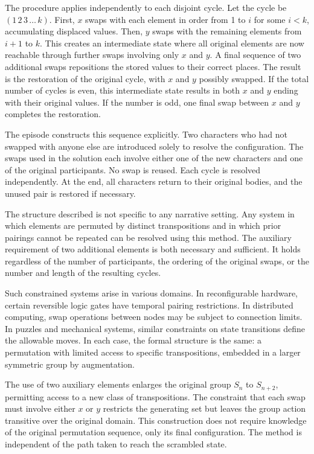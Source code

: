 The procedure applies independently to each disjoint cycle. Let the cycle be \( (1\,2\,3\,\dots\,k) \). First, \( x \) swaps with each element in order from 1 to \( i \) for some \( i < k \), accumulating displaced values. Then, \( y \) swaps with the remaining elements from \( i+1 \) to \( k \). This creates an intermediate state where all original elements are now reachable through further swaps involving only \( x \) and \( y \). A final sequence of two additional swaps repositions the stored values to their correct places. The result is the restoration of the original cycle, with \( x \) and \( y \) possibly swapped. If the total number of cycles is even, this intermediate state results in both \( x \) and \( y \) ending with their original values. If the number is odd, one final swap between \( x \) and \( y \) completes the restoration.

The episode constructs this sequence explicitly. Two characters who had not swapped with anyone else are introduced solely to resolve the configuration. The swaps used in the solution each involve either one of the new characters and one of the original participants. No swap is reused. Each cycle is resolved independently. At the end, all characters return to their original bodies, and the unused pair is restored if necessary.

The structure described is not specific to any narrative setting. Any system in which elements are permuted by distinct transpositions and in which prior pairings cannot be repeated can be resolved using this method. The auxiliary requirement of two additional elements is both necessary and sufficient. It holds regardless of the number of participants, the ordering of the original swaps, or the number and length of the resulting cycles.

Such constrained systems arise in various domains. In reconfigurable hardware, certain reversible logic gates have temporal pairing restrictions. In distributed computing, swap operations between nodes may be subject to connection limits. In puzzles and mechanical systems, similar constraints on state transitions define the allowable moves. In each case, the formal structure is the same: a permutation with limited access to specific transpositions, embedded in a larger symmetric group by augmentation.

The use of two auxiliary elements enlarges the original group \( S_n \) to \( S_{n+2} \), permitting access to a new class of transpositions. The constraint that each swap must involve either \( x \) or \( y \) restricts the generating set but leaves the group action transitive over the original domain. This construction does not require knowledge of the original permutation sequence, only its final configuration. The method is independent of the path taken to reach the scrambled state.

